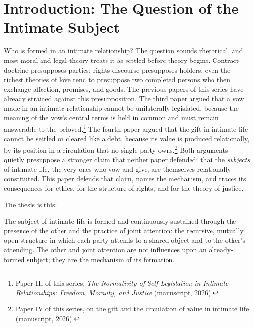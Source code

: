 
\section{Introduction: The Question of the Intimate Subject}

Who is formed in an intimate relationship? The question sounds rhetorical, and most moral and legal theory treats it as settled before theory begins. Contract doctrine presupposes parties; rights discourse presupposes holders; even the richest theories of love tend to presuppose two completed persons who then exchange affection, promises, and goods. The previous papers of this series have already strained against this presupposition. The third paper argued that a vow made in an intimate relationship cannot be unilaterally legislated, because the meaning of the vow's central terms is held in common and must remain answerable to the beloved.\footnote{Paper III of this series, \emph{The Normativity of Self-Legislation in Intimate Relationships: Freedom, Morality, and Justice} (manuscript, 2026).} The fourth paper argued that the gift in intimate life cannot be settled or cleared like a debt, because its value is produced relationally, by its position in a circulation that no single party owns.\footnote{Paper IV of this series, on the gift and the circulation of value in intimate life (manuscript, 2026).} Both arguments quietly presuppose a stronger claim that neither paper defended: that the \emph{subjects} of intimate life, the very ones who vow and give, are themselves relationally constituted. This paper defends that claim, names the mechanism, and traces its consequences for ethics, for the structure of rights, and for the theory of justice.

The thesis is this:

\begin{prop}\label{p05:prop:mechanism}
The subject of intimate life is formed and continuously sustained through the presence of the other and the practice of joint attention: the recursive, mutually open structure in which each party attends to a shared object and to the other's attending. The other and joint attention are not influences upon an already-formed subject; they are the mechanism of its formation.
\end{prop}

